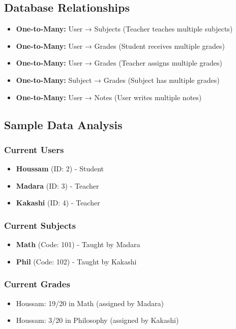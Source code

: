 \documentclass[12pt,a4paper]{article}
\begin{document}
\subsection{Database Relationships}

\begin{itemize}
    \item \textbf{One-to-Many:} User → Subjects (Teacher teaches multiple subjects)
    \item \textbf{One-to-Many:} User → Grades (Student receives multiple grades)
    \item \textbf{One-to-Many:} User → Grades (Teacher assigns multiple grades)
    \item \textbf{One-to-Many:} Subject → Grades (Subject has multiple grades)
    \item \textbf{One-to-Many:} User → Notes (User writes multiple notes)
\end{itemize}

\subsection{Sample Data Analysis}

\subsubsection{Current Users}
\begin{itemize}
    \item \textbf{Houssam} (ID: 2) - Student
    \item \textbf{Madara} (ID: 3) - Teacher
    \item \textbf{Kakashi} (ID: 4) - Teacher
\end{itemize}

\subsubsection{Current Subjects}
\begin{itemize}
    \item \textbf{Math} (Code: 101) - Taught by Madara
    \item \textbf{Phil} (Code: 102) - Taught by Kakashi
\end{itemize}

\subsubsection{Current Grades}
\begin{itemize}
    \item Houssam: 19/20 in Math (assigned by Madara)
    \item Houssam: 3/20 in Philosophy (assigned by Kakashi)
\end{itemize}
\end{document}
